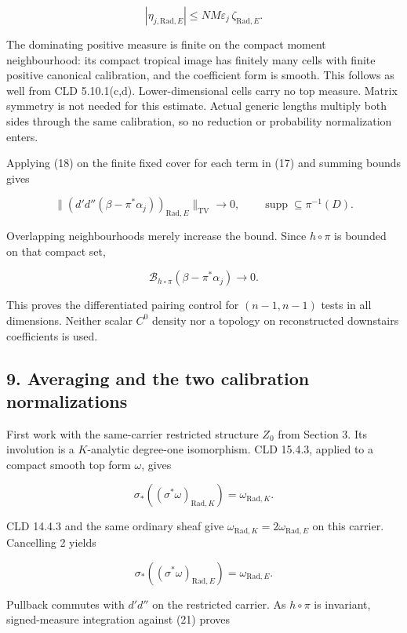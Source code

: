 \documentclass[
  11pt,
]{article}
\begin{document}
\[|\eta_{j,\mathrm{Rad},E}|\leq NM\varepsilon_j\,\zeta_{\mathrm{Rad},E}. \tag{18}\]

The dominating positive measure is finite on the compact moment
neighbourhood: its compact tropical image has finitely many cells with
finite positive canonical calibration, and the coefficient form is
smooth. This follows as well from CLD 5.10.1(c,d). Lower-dimensional
cells carry no top measure. Matrix symmetry is not needed for this
estimate. Actual generic lengths multiply both sides through the same
calibration, so no reduction or probability normalization enters.

Applying (18) on the finite fixed cover for each term in (17) and
summing bounds gives

\[\bigl\|(d'd''(\beta-\pi^*\alpha_j))_{\mathrm{Rad},E}\bigr\|_{\mathrm{TV}}\longrightarrow0,
\qquad\operatorname{supp}\subseteq\pi^{-1}(D). \tag{19}\]

Overlapping neighbourhoods merely increase the bound. Since
\(h\circ\pi\) is bounded on that compact set,

\[\mathcal B_{h\circ\pi}(\beta-\pi^*\alpha_j)\longrightarrow0. \tag{20}\]

This proves the differentiated pairing control for \((n-1,n-1)\) tests
in all dimensions. Neither scalar \(C^0\) density nor a topology on
reconstructed downstairs coefficients is used.

\subsection{9. Averaging and the two calibration
normalizations}\label{averaging-and-the-two-calibration-normalizations}

First work with the same-carrier restricted structure \(Z_0\) from
Section 3. Its involution is a \(K\)-analytic degree-one isomorphism.
CLD 15.4.3, applied to a compact smooth top form \(\omega\), gives

\[\sigma_*((\sigma^*\omega)_{\mathrm{Rad},K})=\omega_{\mathrm{Rad},K}.\]

CLD 14.4.3 and the same ordinary sheaf give
\(\omega_{\mathrm{Rad},K}=2\omega_{\mathrm{Rad},E}\) on this carrier.
Cancelling 2 yields

\[\sigma_*((\sigma^*\omega)_{\mathrm{Rad},E})=\omega_{\mathrm{Rad},E}. \tag{21}\]

Pullback commutes with \(d'd''\) on the restricted carrier. As
\(h\circ\pi\) is invariant, signed-measure integration against (21)
proves
\end{document}
